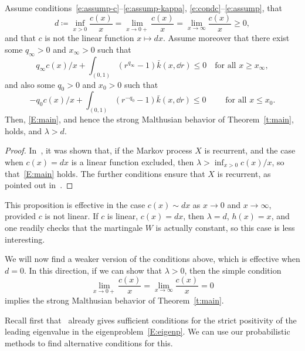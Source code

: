 \begin{prop}\label{P0}
Assume conditions~\eqref{e:assump-c}--\eqref{e:assump-kappa}, \eqref{e:condc}--\eqref{e:assump}, that
\[
d \coloneqq \inf_{x>0} \frac{c(x)}{x} =\lim_{x\to 0+} \frac{c(x)}{x} = \lim_{x\to \infty} \frac{c(x)}{x} \geq 0,
\]
and that $c$ is not the linear function $x \mapsto dx$. Assume moreover that there exist some $q_{\infty}>0$ and $x_{\infty}>0$ such that
\begin{equation}\label{e:lyap1a}
q_{\infty} c(x)/x + \int_{(0,1)} (r^{q_{\infty}}-1)\bar k(x,\dd r) \leq 0 \quad\text{for all }x\geq x_{\infty},
\end{equation}
and also some $q_0>0$ and $x_0>0$ such that
\begin{equation}\label{e:lyap1b}
-q_0 c(x)/x + \int_{(0,1)} (r^{-q_0}-1) \bar k (x,\dd r) \leq 0
\qquad\text{ for all }x\leq x_0.
\end{equation}
Then, \eqref{E:main}, and hence the strong Malthusian behavior of Theorem~\ref{t:main}, holds, and $\lambda > d$.
\end{prop}



\begin{proof}
In~\cite[Proposition~3.4$\MK$(ii)]{BW}, it was shown that, if the Markov process $X$ is recurrent, and the case when $c(x)=dx$ is a linear function excluded, then $\lambda > \inf_{x>0}c(x)/x$, so that~\eqref{E:main} holds. The further conditions ensure that $X$ is recurrent, as pointed out in~\cite[Section~3.6]{BeFK}.
\end{proof}

This proposition is effective in the case $c(x) \sim dx$ as $x\to 0$ and $x\to\infty$, provided $c$ is not linear. If $c$ is linear, $c(x) = dx$, then $\lambda=d$, $h(x)=x$, and one readily checks that the martingale $W$ is actually constant, so this case is less interesting.

We will now find a weaker version of the conditions above, which is effective when $d=0$. In this direction, if we can show that $\lambda > 0$, then the simple condition
\begin{equation}\label{e:c0}
\lim_{x\to 0+}\frac{c(x)}{x} = \lim_{x\to \infty}\frac{c(x)}{x} =0
\end{equation}
implies the strong Malthusian behavior of Theorem~\ref{t:main}.

Recall first that~\cite[Theorem~1]{DoumGab} already gives sufficient conditions for the strict positivity of the leading eigenvalue in the eigenproblem~\eqref{E:eigenp}. We can use our probabilistic methods to find alternative conditions for this.

